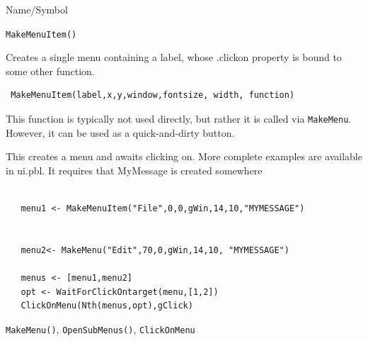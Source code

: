 \begin{desc}{Name/Symbol}
\item[Name/Symbol]  	\verb+MakeMenuItem()+

\item[Description]	
Creates a single menu containing a label, whose .clickon property is bound to some other function.

\item[Usage]
\begin{verbatim}
 MakeMenuItem(label,x,y,window,fontsize, width, function)
 \end{verbatim}
This function is typically not used directly, but rather it is called via \texttt{MakeMenu}. However, it can be used as a quick-and-dirty button.

\item[Example]      	
This creates a menu and awaits clicking on.  More complete examples are available in ui.pbl.  It requires that MyMessage is created somewhere
\begin{verbatim}

   menu1 <- MakeMenuItem("File",0,0,gWin,14,10,"MYMESSAGE")


   menu2<- MakeMenu("Edit",70,0,gWin,14,10, "MYMESSAGE")
   
   menus <- [menu1,menu2]
   opt <- WaitForClickOntarget(menu,[1,2])
   ClickOnMenu(Nth(menus,opt),gClick)
\end{verbatim}

\item[See Also]	\verb+MakeMenu()+, \verb+OpenSubMenus()+, \verb+ClickOnMenu+
\end{desc}



